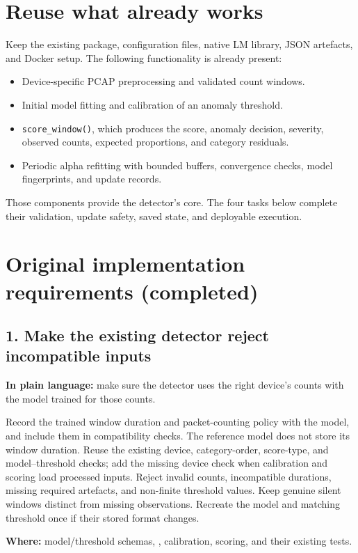 \documentclass[11pt,a4paper]{article}
\begin{document}
\section{Reuse what already works}

Keep the existing package, configuration files, native LM library, JSON
artefacts, and Docker setup. The following functionality is already present:
\begin{itemize}
  \item Device-specific PCAP preprocessing and validated count windows.
  \item Initial model fitting and calibration of an anomaly threshold.
  \item \texttt{score\_window()}, which produces the score, anomaly decision,
  severity, observed counts, expected proportions, and category residuals.
  \item Periodic alpha refitting with bounded buffers, convergence checks,
  model fingerprints, and update records.
\end{itemize}
Those components provide the detector's core. The four tasks below complete
their validation, update safety, saved state, and deployable execution.

\section{Original implementation requirements (completed)}

\subsection{1. Make the existing detector reject incompatible inputs}

\textbf{In plain language:} make sure the detector uses the right device's counts
with the model trained for those counts.

Record the trained window duration and packet-counting policy with the model,
and include them in compatibility checks. The reference model does not store
its window duration. Reuse the existing device, category-order, score-type, and
model--threshold checks; add the missing device check when calibration and
scoring load processed inputs. Reject invalid counts, incompatible durations,
missing required artefacts, and non-finite threshold values. Keep genuine silent
windows distinct from missing observations. Recreate the model and matching
threshold once if their stored format changes.

\textbf{Where:} model/threshold schemas, ,
calibration, scoring, and their existing tests.
\end{document}
